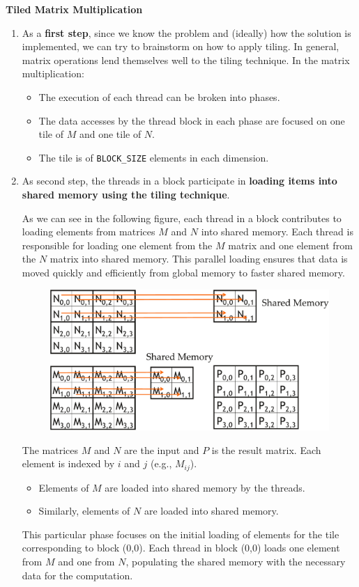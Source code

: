 \begin{flushleft}
    \textcolor{Green3}{ \textbf{Tiled Matrix Multiplication}}
\end{flushleft}
\begin{enumerate}
    \item As a \textbf{first step}, since we know the problem and (ideally) how the solution is implemented, we can try to brainstorm on how to apply tiling. In general, matrix operations lend themselves well to the tiling technique. In the matrix multiplication:
    \begin{itemize}
        \item The execution of each thread can be broken into phases.
        \item The data accesses by the thread block in each phase are focused on one tile of $M$ and one tile of $N$.
        \item The tile is of \texttt{BLOCK\_SIZE} elements in each dimension.
    \end{itemize}


    \item As second step, the threads in a block participate in \textbf{loading items into shared memory using the tiling technique}.
    
    As we can see in the following figure, each thread in a block contributes to loading elements from matrices $M$ and $N$ into shared memory. Each thread is responsible for loading one element from the $M$ matrix and one element from the $N$ matrix into shared memory. This parallel loading ensures that data is moved quickly and efficiently from global memory to faster shared memory.

    \begin{figure}[!htp]
        \centering
        \includegraphics[width=.8\textwidth]{img/cuda-tiled-matrix-multiplication-1.pdf}
    \end{figure}

    The matrices $M$ and $N$ are the input and $P$ is the result matrix. Each element is indexed by $i$ and $j$ (e.g., $M_{ij}$).
    \begin{itemize}
        \item Elements of $M$ are loaded into shared memory by the threads.
        \item Similarly, elements of $N$ are loaded into shared memory.
    \end{itemize}
    This particular phase focuses on the initial loading of elements for the tile corresponding to block (0,0). Each thread in block (0,0) loads one element from $M$ and one from $N$, populating the shared memory with the necessary data for the computation.


\end{enumerate}
